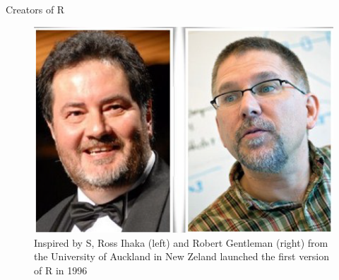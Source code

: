 \documentclass[11pt]{beamer}\usepackage[]{graphicx}\usepackage[]{color}
\begin{document}
\begin{frame}{Creators of R}
\begin{center}
\begin{figure}
\includegraphics[scale=0.790]{rr.png}
\caption{Inspired by S, Ross Ihaka (left) and Robert Gentleman (right) from the  University of Auckland in New Zeland launched the first version of R in 1996}
\end{figure}
\end{center}
\end{frame}

\end{document}
